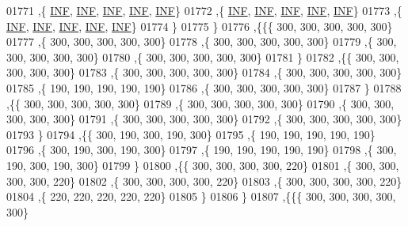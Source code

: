 \begin{DoxyCode}
01771    ,\{   \mbox{\hyperlink{1_88_84__epars_8h_a12c2040f25d8e3a7b9e1c2024c618cb6}{INF}},   \mbox{\hyperlink{1_88_84__epars_8h_a12c2040f25d8e3a7b9e1c2024c618cb6}{INF}},   \mbox{\hyperlink{1_88_84__epars_8h_a12c2040f25d8e3a7b9e1c2024c618cb6}{INF}},   \mbox{\hyperlink{1_88_84__epars_8h_a12c2040f25d8e3a7b9e1c2024c618cb6}{INF}},   \mbox{\hyperlink{1_88_84__epars_8h_a12c2040f25d8e3a7b9e1c2024c618cb6}{INF}}\}
01772    ,\{   \mbox{\hyperlink{1_88_84__epars_8h_a12c2040f25d8e3a7b9e1c2024c618cb6}{INF}},   \mbox{\hyperlink{1_88_84__epars_8h_a12c2040f25d8e3a7b9e1c2024c618cb6}{INF}},   \mbox{\hyperlink{1_88_84__epars_8h_a12c2040f25d8e3a7b9e1c2024c618cb6}{INF}},   \mbox{\hyperlink{1_88_84__epars_8h_a12c2040f25d8e3a7b9e1c2024c618cb6}{INF}},   \mbox{\hyperlink{1_88_84__epars_8h_a12c2040f25d8e3a7b9e1c2024c618cb6}{INF}}\}
01773    ,\{   \mbox{\hyperlink{1_88_84__epars_8h_a12c2040f25d8e3a7b9e1c2024c618cb6}{INF}},   \mbox{\hyperlink{1_88_84__epars_8h_a12c2040f25d8e3a7b9e1c2024c618cb6}{INF}},   \mbox{\hyperlink{1_88_84__epars_8h_a12c2040f25d8e3a7b9e1c2024c618cb6}{INF}},   \mbox{\hyperlink{1_88_84__epars_8h_a12c2040f25d8e3a7b9e1c2024c618cb6}{INF}},   \mbox{\hyperlink{1_88_84__epars_8h_a12c2040f25d8e3a7b9e1c2024c618cb6}{INF}}\}
01774    \}
01775   \}
01776  ,\{\{\{   300,   300,   300,   300,   300\}
01777    ,\{   300,   300,   300,   300,   300\}
01778    ,\{   300,   300,   300,   300,   300\}
01779    ,\{   300,   300,   300,   300,   300\}
01780    ,\{   300,   300,   300,   300,   300\}
01781    \}
01782   ,\{\{   300,   300,   300,   300,   300\}
01783    ,\{   300,   300,   300,   300,   300\}
01784    ,\{   300,   300,   300,   300,   300\}
01785    ,\{   190,   190,   190,   190,   190\}
01786    ,\{   300,   300,   300,   300,   300\}
01787    \}
01788   ,\{\{   300,   300,   300,   300,   300\}
01789    ,\{   300,   300,   300,   300,   300\}
01790    ,\{   300,   300,   300,   300,   300\}
01791    ,\{   300,   300,   300,   300,   300\}
01792    ,\{   300,   300,   300,   300,   300\}
01793    \}
01794   ,\{\{   300,   190,   300,   190,   300\}
01795    ,\{   190,   190,   190,   190,   190\}
01796    ,\{   300,   190,   300,   190,   300\}
01797    ,\{   190,   190,   190,   190,   190\}
01798    ,\{   300,   190,   300,   190,   300\}
01799    \}
01800   ,\{\{   300,   300,   300,   300,   220\}
01801    ,\{   300,   300,   300,   300,   220\}
01802    ,\{   300,   300,   300,   300,   220\}
01803    ,\{   300,   300,   300,   300,   220\}
01804    ,\{   220,   220,   220,   220,   220\}
01805    \}
01806   \}
01807  ,\{\{\{   300,   300,   300,   300,   300\}

\end{DoxyCode}
